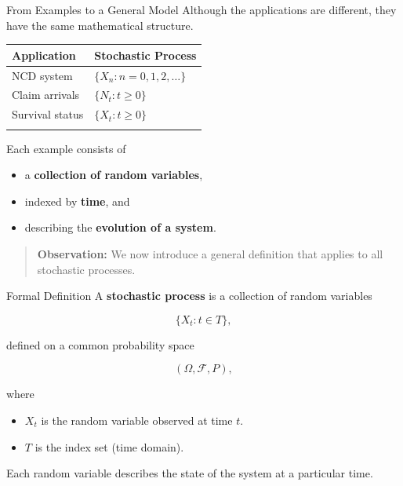 \documentclass[
  ignorenonframetext,
  aspectratio=169,
]{beamer}
\newcounter{none} %
\providecommand{\tightlist}{%
  \setlength{\itemsep}{0pt}\setlength{\parskip}{0pt}}
\begin{document}
\begin{frame}{From Examples to a General Model}
\protect{}\label{from-examples-to-a-general-model}
Although the applications are different, they have the same mathematical
structure.

{\def\LTcaptype{none} %
\begin{longtable}[]{@{}ll@{}}
\toprule\noalign{}
Application & Stochastic Process \\
\midrule\noalign{}
\endhead
NCD system & \(\{X_n:n=0,1,2,\ldots\}\) \\
Claim arrivals & \(\{N_t:t\ge0\}\) \\
Survival status & \(\{X_t:t\ge0\}\) \\
\bottomrule\noalign{}
\end{longtable}
}

Each example consists of

\begin{itemize}
\tightlist
\item
  a \textbf{collection of random variables},
\item
  indexed by \textbf{time}, and
\item
  describing the \textbf{evolution of a system}.
\end{itemize}

\begin{quote}
\textbf{Observation:} We now introduce a general definition that applies
to all stochastic processes.
\end{quote}
\end{frame}

\begin{frame}{Formal Definition}
\protect{}\label{formal-definition}
A \textbf{stochastic process} is a collection of random variables

\[
\{X_t:t\in T\},
\]

defined on a common probability space

\[
(\Omega,\mathcal{F},P),
\]

where

\begin{itemize}
\tightlist
\item
  \textbf{\(X_t\)} is the random variable observed at time \(t\).
\item
  \textbf{\(T\)} is the index set (time domain).
\end{itemize}

Each random variable describes the state of the system at a particular
time.
\end{frame}
\end{document}
